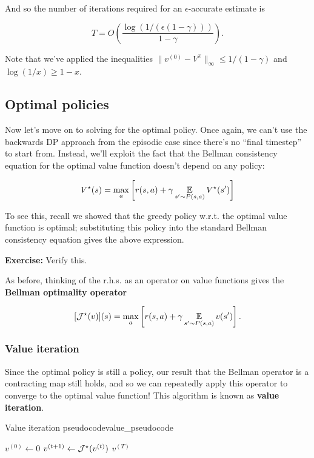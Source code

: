 \documentclass[../main/main]{subfiles}
\begin{document}
And so the number of iterations required for an $\epsilon$-accurate estimate is

\begin{equation}
    T = O\left( \frac{\log(1/(\epsilon (1-\gamma)))}{1-\gamma} \right). \label{eq:iterations_vi}
\end{equation}

Note that we've applied the inequalities $\|v^{(0)} - V^\pi\|_{\infty} \le 1/(1-\gamma)$ and $\log (1/x) \ge 1-x$.

\subsection{Optimal policies}

Now let's move on to solving for the optimal policy. Once again, we can't use the backwards DP approach from the episodic case since there's no ``final timestep'' to start from. Instead, we'll exploit the fact that the Bellman consistency equation for the optimal value function doesn't depend on any policy:

\[
    V^\star(s) = \max_a \left[ r(s, a) + \gamma \operatorname*{\mathbb{E}}_{s' \sim P(s, a)} V^\star(s') \right]
\]

To see this, recall we showed that the greedy policy w.r.t. the optimal value function is optimal; substituting this policy into the standard Bellman consistency equation gives the above expression.

\textbf{Exercise:} Verify this.

As before, thinking of the r.h.s. as an operator on value functions gives the \textbf{Bellman optimality operator}

\[
    [\mathcal{J}^{\star}(v)](s) = \max_a \left[ r(s, a) + \gamma \operatorname*{\mathbb{E}}_{s' \sim P(s, a)} v(s') \right].
\]

\subsubsection{Value iteration}

Since the optimal policy is still a policy, our result that the Bellman operator is a contracting map still holds, and so we can repeatedly apply this operator to converge to the optimal value function! This algorithm is known as \textbf{value iteration}.

\begin{definition}{Value iteration pseudocode}{value_pseudocode}
    \begin{algorithmic}
        \State $v^{(0)} \gets 0$
            \State $v^{(t+1)} \gets \mathcal{J}^{\star}(v^{(t)})$
        \EndFor
        \State \Return $v^{(T)}$
    \end{algorithmic}
\end{definition}
\end{document}
